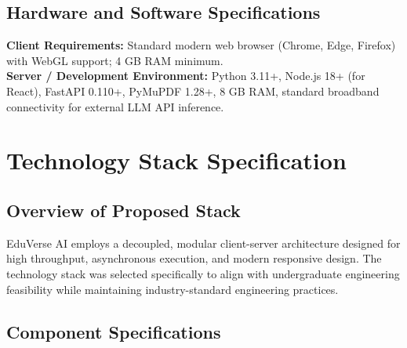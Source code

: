 \documentclass[11pt,a4paper]{report}
\begin{document}
\section{Hardware and Software Specifications}
\textbf{Client Requirements:} Standard modern web browser (Chrome, Edge, Firefox) with WebGL support; 4 GB RAM minimum.\\
\textbf{Server / Development Environment:} Python 3.11+, Node.js 18+ (for React), FastAPI 0.110+, PyMuPDF 1.28+, 8 GB RAM, standard broadband connectivity for external LLM API inference.
\clearpage

\chapter{Technology Stack Specification}
\label{ch:tech_stack}

\section{Overview of Proposed Stack}
EduVerse AI employs a decoupled, modular client-server architecture designed for high throughput, asynchronous execution, and modern responsive design. The technology stack was selected specifically to align with undergraduate engineering feasibility while maintaining industry-standard engineering practices.

\section{Component Specifications}
\end{document}

